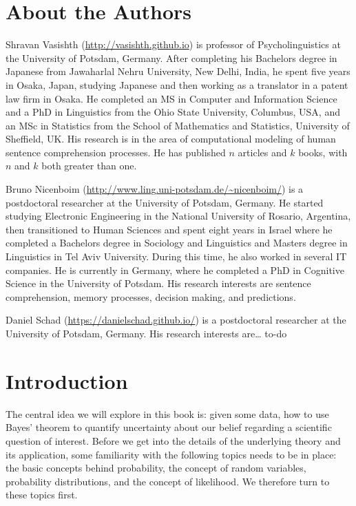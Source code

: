 \documentclass[12pt,]{krantz}
\begin{document}
\hypertarget{about-the-authors}{%
\chapter*{About the Authors}\label{about-the-authors}}


Shravan Vasishth (\url{http://vasishth.github.io}) is professor of Psycholinguistics at the University of Potsdam, Germany. After completing his Bachelors degree in Japanese from Jawaharlal Nehru University, New Delhi, India, he spent five years in Osaka, Japan, studying Japanese and then working as a translator in a patent law firm in Osaka. He completed an MS in Computer and Information Science and a PhD in Linguistics from the Ohio State University, Columbus, USA, and an MSc in Statistics from the School of Mathematics and Statistics, University of Sheffield, UK. His research is in the area of computational modeling of human sentence comprehension processes. He has published \(n\) articles and \(k\) books, with \(n\) and \(k\) both greater than one.

Bruno Nicenboim (\url{http://www.ling.uni-potsdam.de/~nicenboim/}) is a postdoctoral researcher at the University of Potsdam, Germany. He started studying Electronic Engineering in the National University of Rosario, Argentina, then transitioned to Human Sciences and spent eight years in Israel where he completed a Bachelors degree in Sociology and Linguistics and Masters degree in Linguistics in Tel Aviv University. During this time, he also worked in several IT companies. He is currently in Germany, where he completed a PhD in Cognitive Science in the University of Potsdam. His research interests are sentence comprehension, memory processes, decision making, and predictions.

Daniel Schad (\url{https://danielschad.github.io/}) is a postdoctoral researcher at the University of Potsdam, Germany. His research interests are\ldots{} to-do

\mainmatter

\hypertarget{introduction}{%
\chapter{Introduction}\label{introduction}}

The central idea we will explore in this book is: given some data, how to use Bayes' theorem to quantify uncertainty about our belief regarding a scientific question of interest. Before we get into the details of the underlying theory and its application, some familiarity with the following topics needs to be in place: the basic concepts behind probability, the concept of random variables, probability distributions, and the concept of likelihood. We therefore turn to these topics first.
\end{document}
